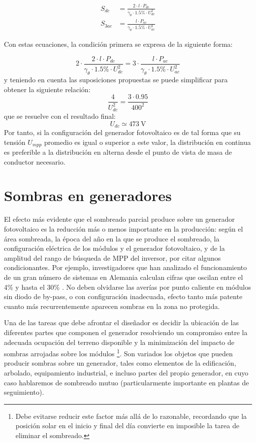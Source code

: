 \begin{align*}
  S_{dc}&=\frac{2\cdot l\cdot P_{dc}}{\gamma_\theta\cdot1.5\%\cdot U_{dc}^{2}}\\
  S_{3ac}&=\frac{l\cdot P_{ac}}{\gamma_\theta\cdot1.5\%\cdot U_{ac}^{2}}
\end{align*}


Con estas ecuaciones, la condición primera se expresa de la siguiente
forma:

\[
  2\cdot\frac{2\cdot l\cdot P_{dc}}{\gamma_\theta\cdot1.5\%\cdot U_{dc}^{2}}=3\cdot\frac{l\cdot P_{ac}}{\gamma_\theta\cdot1.5\%\cdot U_{ac}^{2}}
\]
y teniendo en cuenta las suposiciones propuestas se puede simplificar para obtener la siguiente relación:
\[
  \frac{4}{U_{dc}^{2}}=\frac{3\cdot0.95}{400^{2}}
\]
que se resuelve con el resultado final:
\[
  U_{dc}\simeq\SI{473}{\volt}
\]
Por tanto, si la configuración del generador fotovoltaico es de tal
forma que su tensión $U_{mpp}$ promedio es igual o superior a este
valor, la distribución en continua es preferible a la distribución en
alterna desde el punto de vista de masa de conductor necesario.

\section{Sombras en generadores}
\label{sec:sombras}
El efecto más evidente que el sombreado parcial produce sobre un generador
fotovoltaico es la reducción más o menos importante en la producción:
según el área sombreada, la época del año en la que se produce el
sombreado, la configuración eléctrica de los módulos y el generador
fotovoltaico, y de la amplitud del rango de búsqueda de MPP del inversor,
por citar algunos condicionantes. Por ejemplo, investigadores que
han analizado el funcionamiento de un gran número de sistemas en Alemania
calculan cifras que oscilan entre el 4\% y hasta el 30\% \cite{Decker.Jahn1997,Jahn.Nasse2004}.
No deben olvidarse las averías por punto caliente en módulos sin diodo
de by-pass, o con configuración inadecuada, efecto tanto más patente
cuanto más recurrentemente aparecen sombras en la zona no protegida.

Una de las tareas que debe afrontar el diseñador es decidir la ubicación
de las diferentes partes que componen el generador resolviendo un
compromiso entre la adecuada ocupación del terreno disponible y la
minimización del impacto de sombras arrojadas sobre los módulos%
\footnote{Debe evitarse reducir este factor más allá de lo razonable, recordando
que la posición solar en el inicio y final del día convierte en imposible
la tarea de eliminar el sombreado.%
}. Son variados los objetos que pueden producir sombras sobre un generador,
tales como elementos de la edificación, arbolado, equipamiento industrial,
e incluso partes del propio generador, en cuyo caso hablaremos de
sombreado mutuo (particularmente importante en plantas de seguimiento).

